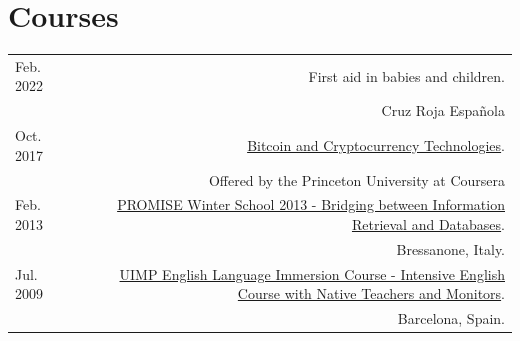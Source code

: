 \documentclass[10pt]{article}
\begin{document}
\section*{Courses}
\begin{tabular}{L!{\VRule}R}
	Feb. 2022 & First aid in babies and children. \\
	&\scriptsize{Cruz Roja Española}\vspace{5pt}\\

	Oct. 2017 & \href{https://www.coursera.org/learn/cryptocurrency}{Bitcoin and Cryptocurrency Technologies}. \\
	&\scriptsize{Offered by the Princeton University at Coursera}\vspace{5pt}\\
	
	Feb. 2013 & \href{http://www.promise-noe.eu/events/winter-school-2013/}{PROMISE Winter School 2013 - Bridging between Information Retrieval and Databases}.\\
	&\scriptsize{Bressanone, Italy.} \vspace{5pt}\\

Jul. 2009 & \href{http://www.uimp.es/inmersion/inmersion.html}{UIMP English Language Immersion Course - Intensive English Course with Native Teachers and Monitors}.\\
&\scriptsize{Barcelona, Spain.} \vspace{5pt}\\
\end{tabular}
\end{document}

